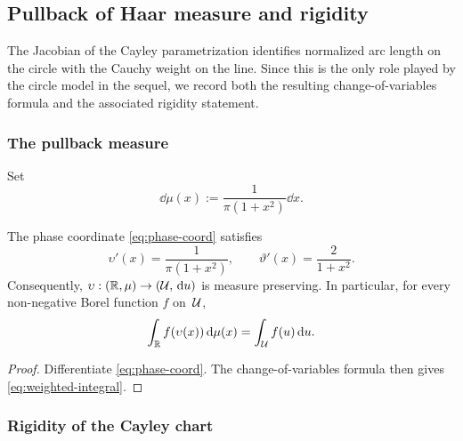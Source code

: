 \subsection{Pullback of Haar measure and rigidity}

The Jacobian of the Cayley parametrization identifies normalized arc
length on the circle with the Cauchy weight on the line.  Since this is
the only role played by the circle model in the sequel, we record both
the resulting change-of-variables formula and the associated rigidity
statement.

\subsubsection{The pullback measure}

Set
\begin{equation}\label{eq:cauchy-measure}
\dd\mu(x):=\frac{1}{\pi(1+x^{2})}\dd x.
\end{equation}

\begin{proposition}\label{prop:phase-derivative}
The phase coordinate \eqref{eq:phase-coord} satisfies
\begin{equation}\label{eq:phase-deriv}
\upsilon'(x)=\frac{1}{\pi(1+x^{2})},
\qquad
\vartheta'(x)=\frac{2}{1+x^{2}}.
\end{equation}
Consequently, $\upsilon:(\mathbb{R},\mu)\to(\mathcal{U},\,\mathrm{d} u)$ is measure preserving.
In particular, for every non-negative Borel function $f$ on~$\mathcal{U}$,
\begin{equation}\label{eq:weighted-integral}
\int_{\mathbb{R}}f(\upsilon(x))\,\mathrm{d}\mu(x)=\int_{\mathcal{U}}f(u)\,\mathrm{d} u.
\end{equation}
\end{proposition}

\begin{proof}
Differentiate \eqref{eq:phase-coord}.  The change-of-variables formula
then gives \eqref{eq:weighted-integral}.
\end{proof}

\subsubsection{Rigidity of the Cayley chart}

